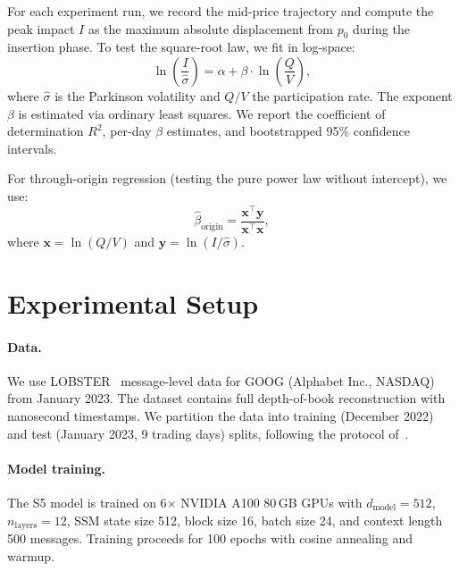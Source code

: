 \documentclass[sigplan,screen,anonymous]{acmart}
\begin{document}
For each experiment run, we record the mid-price trajectory and compute the peak impact $I$ as the maximum absolute displacement from $p_0$ during the insertion phase. To test the square-root law, we fit in log-space:
\begin{equation}
  \ln\!\left(\frac{I}{\hat{\sigma}}\right) = \alpha + \beta \cdot \ln\!\left(\frac{Q}{V}\right),
  \label{eq:loglog}
\end{equation}
where $\hat{\sigma}$ is the Parkinson volatility and $Q/V$ the participation rate. The exponent $\beta$ is estimated via ordinary least squares. We report the coefficient of determination $R^2$, per-day $\beta$ estimates, and bootstrapped 95\% confidence intervals.

For through-origin regression (testing the pure power law without intercept), we use:
\begin{equation}
  \hat{\beta}_{\text{origin}} = \frac{\mathbf{x}^\top \mathbf{y}}{\mathbf{x}^\top \mathbf{x}},
  \label{eq:through_origin}
\end{equation}
where $\mathbf{x} = \ln(Q/V)$ and $\mathbf{y} = \ln(I/\hat{\sigma})$.


\section{Experimental Setup}
\label{sec:setup}

\paragraph{Data.} We use LOBSTER~\cite{lobster2023} message-level data for GOOG (Alphabet Inc., NASDAQ) from January 2023. The dataset contains full depth-of-book reconstruction with nanosecond timestamps. We partition the data into training (December 2022) and test (January 2023, 9 trading days) splits, following the protocol of~\cite{nagy2023generative}.

\paragraph{Model training.} The S5 model is trained on 6$\times$ NVIDIA A100 80\,GB GPUs with $d_{\text{model}} = 512$, $n_{\text{layers}} = 12$, SSM state size 512, block size 16, batch size 24, and context length 500 messages. Training proceeds for 100 epochs with cosine annealing and warmup.
\end{document}
